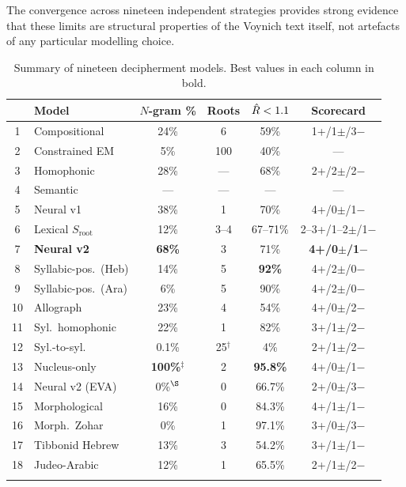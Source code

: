 The convergence across nineteen independent strategies provides strong evidence that these limits are structural properties of the Voynich text itself, not artefacts of any particular modelling choice.

\ifoup\begin{table}\else\begin{table}[htbp]\fi
\caption{Summary of nineteen decipherment models.  Best values in each column in bold.}
\label{tab:convergence}
\ifoup\begin{tabular*}{\textwidth}{@{\extracolsep\fill}clcccc@{}}\else\begin{tabular}{clcccc}\fi
\toprule
\# & Model & $N$-gram \% & Roots & $\hat{R} < 1.1$ & Scorecard \\
\midrule
1 & Compositional & 24\% & 6 & 59\% & 1+/1$\pm$/3$-$ \\
2 & Constrained EM & 5\% & 100 & 40\% & --- \\
3 & Homophonic & 28\% & --- & 68\% & 2+/2$\pm$/2$-$ \\
4 & Semantic & --- & --- & --- & --- \\
5 & Neural v1 & 38\% & 1 & 70\% & 4+/0$\pm$/1$-$ \\
6 & Lexical $S_{\text{root}}$ & 12\% & 3--4 & 67--71\% & 2--3+/1--2$\pm$/1$-$ \\
7 & \textbf{Neural v2} & \textbf{68\%} & 3 & 71\% & \textbf{4+/0$\pm$/1$-$} \\
8 & Syllabic-pos.\ (Heb) & 14\% & 5 & \textbf{92\%} & 4+/2$\pm$/0$-$ \\
9 & Syllabic-pos.\ (Ara) & 6\% & 5 & 90\% & 4+/2$\pm$/0$-$ \\
10 & Allograph & 23\% & 4 & 54\% & 4+/0$\pm$/2$-$ \\
11 & Syl.\ homophonic & 22\% & 1 & 82\% & 3+/1$\pm$/2$-$ \\
12 & Syl.-to-syl. & 0.1\% & 25$^\dagger$ & 4\% & 2+/1$\pm$/2$-$ \\
13 & Nucleus-only & \textbf{100\%}$^\ddagger$ & 2 & \textbf{95.8\%} & 4+/0$\pm$/1$-$ \\
14 & Neural v2 (EVA) & 0\%$^\S$ & 0 & 66.7\% & 2+/0$\pm$/3$-$ \\
15 & Morphological & 16\% & 0 & 84.3\% & 4+/1$\pm$/1$-$ \\
16 & Morph.\ Zohar & 0\% & 1 & 97.1\% & 3+/0$\pm$/3$-$ \\
17 & Tibbonid Hebrew & 13\% & 3 & 54.2\% & 3+/1$\pm$/1$-$ \\
18 & Judeo-Arabic & 12\% & 1 & 65.5\% & 2+/1$\pm$/2$-$ \\

\end{tabular}
\end{tabular*}
\end{table}
\end{table}
